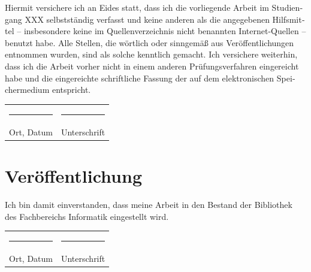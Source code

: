 \documentclass[
	12pt,
	a4paper,
	BCOR10mm,
	DIV14,
	headsepline,
	usegeometry,
]{scrreprt}
\begin{document}
\begin{otherlanguage}{ngerman}
Hiermit versichere ich an Eides statt, dass ich die vorliegende Arbeit im Studiengang XXX selbstständig verfasst und keine anderen als die angegebenen Hilfsmittel -- insbesondere keine im Quellenverzeichnis nicht benannten Internet-Quellen -- benutzt habe.
Alle Stellen, die wörtlich oder sinngemäß aus Veröffentlichungen entnommen wurden, sind als solche kenntlich gemacht.
Ich versichere weiterhin, dass ich die Arbeit vorher nicht in einem anderen Prüfungsverfahren eingereicht habe und die eingereichte schriftliche Fassung der auf dem elektronischen Speichermedium entspricht.
\end{otherlanguage}

\vspace{1cm}

\begin{center}
\begin{tabular}{ll}
	\rule{0.35\textwidth}{0.4pt} & \rule{0.55\textwidth}{0.4pt} \\
	Ort, Datum & Unterschrift
\end{tabular}
\end{center}

\vfill

\section*{Veröffentlichung}

\begin{otherlanguage}{ngerman}
Ich bin damit einverstanden, dass meine Arbeit in den Bestand der Bibliothek des Fachbereichs Informatik eingestellt wird.
\end{otherlanguage}

\vspace{1cm}

\begin{center}
\begin{tabular}{ll}
	\rule{0.35\textwidth}{0.4pt} & \rule{0.55\textwidth}{0.4pt} \\
	Ort, Datum & Unterschrift
\end{tabular}
\end{center}
\end{document}
